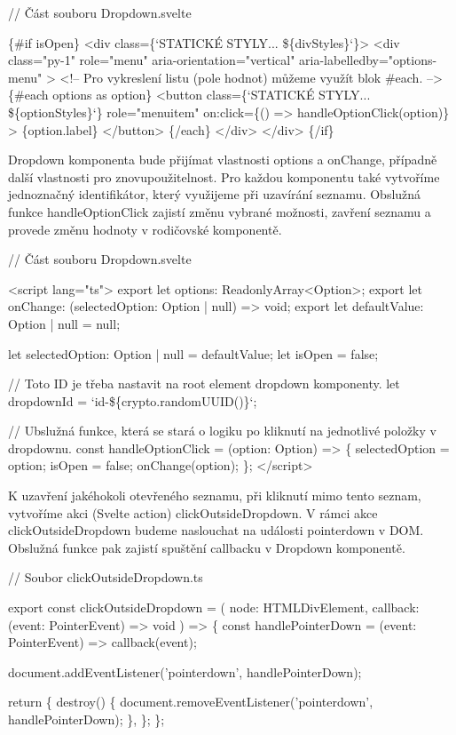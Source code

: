 \begin{prog}
// Část souboru Dropdown.svelte

\{#if isOpen\}
  <div class=\{`STATICKÉ STYLY... \$\{divStyles\}`\}>
    <div 
      class="py-1" role="menu" 
      aria-orientation="vertical" aria-labelledby="options-menu"
    >
      <!-- Pro vykreslení listu (pole hodnot) můžeme využít blok #each. -->
      \{#each options as option\}
        <button
          class=\{`STATICKÉ STYLY... \$\{optionStyles\}`\}
          role="menuitem"
          on:click=\{() => handleOptionClick(option)\}
        >
          \{option.label\}
        </button>
      \{/each\}
    </div>
  </div>
\{/if\}
\end{prog}

Dropdown komponenta bude přijímat vlastnosti options a onChange, případně další vlastnosti pro znovupoužitelnost. Pro každou komponentu také vytvoříme jednoznačný identifikátor, který využijeme při uzavírání seznamu.
Obslužná funkce handleOptionClick zajistí změnu vybrané možnosti, zavření seznamu a provede změnu hodnoty v rodičovské komponentě. 

\begin{prog}
// Část souboru Dropdown.svelte
  
<script lang="ts">
  export let options: ReadonlyArray<Option>;
  export let onChange: (selectedOption: Option | null) => void;
  export let defaultValue: Option | null = null;

  let selectedOption: Option | null = defaultValue;
  let isOpen = false;

  // Toto ID je třeba nastavit na root element dropdown komponenty.
  let dropdownId = `id-\$\{crypto.randomUUID()\}`;

  // Ubslužná funkce, která se stará o logiku 
    po kliknutí na jednotlivé položky v dropdownu.
  const handleOptionClick = (option: Option) => \{
    selectedOption = option;
    isOpen = false;
    onChange(option);
  \};
</script>
\end{prog}

K uzavření jakéhokoli otevřeného seznamu, při kliknutí mimo tento seznam, vytvoříme akci (Svelte action) clickOutsideDropdown. 
V rámci akce clickOutsideDropdown budeme naslouchat na události pointerdown v DOM. Obslužná funkce pak zajistí spuštění callbacku v Dropdown komponentě.

\begin{prog}
// Soubor clickOutsideDropdown.ts

export const clickOutsideDropdown = (
  node: HTMLDivElement,
  callback: (event: PointerEvent) => void
) => \{
  const handlePointerDown = (event: PointerEvent) => callback(event);

  document.addEventListener('pointerdown', handlePointerDown);

  return \{
    destroy() \{
      document.removeEventListener('pointerdown', handlePointerDown);
    \},
  \};
\};
\end{prog}

